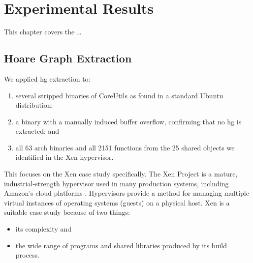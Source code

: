 \chapter{Experimental Results}\label{ch:hg-results}
This chapter covers the \todo\dots

\section{Hoare Graph Extraction}\label{hg-extraction}
We applied \ac{hg} extraction to:
\begin{enumerate}
  \item several stripped binaries of CoreUtils as found in a standard Ubuntu distribution;
  \item a binary with a manually induced buffer overflow, confirming that no \ac{hg} is extracted; and
  \item all 63  \gls{arch} binaries and all 2151 functions from the 25 shared objects we identified in the Xen hypervisor.
\end{enumerate}
This  %
focuses on the Xen case study specifically.
The Xen Project is a mature, industrial-strength hypervisor used in many production systems, including Amazon's cloud platforms \autocite{chisnall2008definitive}.
Hypervisors provide a method for managing multiple virtual instances of operating systems (guests) on a physical host.
Xen is a suitable case study because of two things:
\begin{itemize}
  \item its complexity and
  \item the wide range of programs and shared libraries produced by its build process.
\end{itemize}

